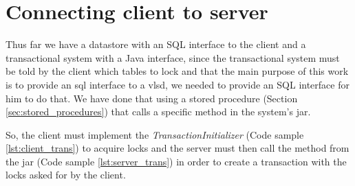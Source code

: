 \section{Connecting client to server}
Thus far we have a datastore with an SQL interface to the client and a transactional system with a Java interface, since the transactional system must be told by the client which tables to lock and that the main purpose of this work is to provide an \ac{sql} interface to a  \ac{vlsd}, we needed to provide an SQL interface for him to do that. We have done that using a stored procedure (Section \ref{sec:stored_procedures}) that calls a specific method in the system's jar.

So, the client must implement the \emph{TransactionInitializer} (Code sample \ref{lst:client_trans}) to acquire locks and the server must then call the method from the jar (Code sample \ref{lst:server_trans}) in order to create a transaction with the locks asked for by the client. 


